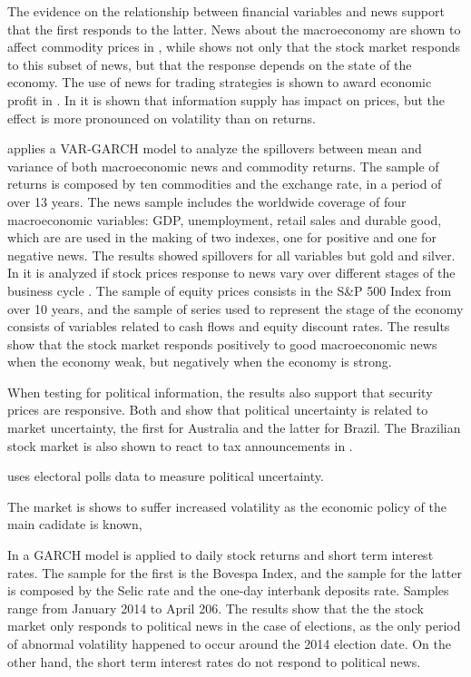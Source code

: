 \documentclass[a4paper]{article}
\begin{document}
The evidence on the relationship between financial variables and news support that the first responds to the latter. News about the macroeconomy are shown to affect commodity prices in 
\citet{caporaleetal2015}, while \citet{macqueenroley1993} shows not only that the stock market responds to this subset of news, but that the response depends on the state of the economy. The use of news for trading strategies is shown to award economic profit in \citet{larsenthorsrud2017}. In \citet{moussaetal2017} it is shown that information supply has impact on prices, but the effect is more pronounced on volatility than on returns.

\citet{caporaleetal2015} applies a VAR-GARCH model to analyze the spillovers between mean and variance of both macroeconomic news and commodity returns. The sample of returns is composed by ten commodities and the exchange rate, in a period of over 13 years. The news sample includes the worldwide coverage of four macroeconomic variables: GDP, unemployment, retail sales and durable good, which are are used in the making of two indexes, one for positive and one for negative news. The results showed spillovers for all variables but gold and silver. In \citet{macqueenroley1993} it is analyzed if stock prices response to news vary over different stages of the business cycle . The sample of equity prices consists in the S\&P 500 Index from over 10 years, and the sample of series used to represent the stage of the economy consists of variables related to cash flows and equity discount rates. The results show that the stock market responds positively to good macroeconomic news when the economy weak, but negatively when the economy is strong. 

When testing for political information, the results also support that security prices are responsive. Both \citet{smales2015} and \citet{marquessantos2016} show that political uncertainty is related to market uncertainty, the first for Australia and the latter for Brazil. The Brazilian stock market is also shown to react to tax announcements in \cite{gabrielribeiro2013}.


\citet{smales2015} uses electoral polls data to measure political uncertainty.

The market is shows to suffer increased volatility as the economic policy of the main cadidate is known, 



In \citet{marquessantos2016} a GARCH model is applied to daily stock returns and short term interest rates. The sample for the first is the Bovespa Index, and the sample for the latter is composed by the Selic rate and the one-day interbank deposits rate. Samples range from January 2014 to April 206. The results show that the the stock market only responds to political news in the case of elections, as the only period of abnormal volatility happened to occur around the 2014 election date. On the other hand, the short term interest rates do not respond to political news.
\end{document}
